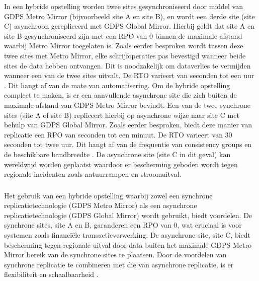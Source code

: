 In een hybride opstelling worden twee sites gesynchroniseerd door middel van GDPS Metro Mirror (bijvoorbeeld site A en site B), en wordt een derde site (site C) asynchroon gerepliceerd met GDPS Global Mirror.
Hierbij geldt dat site A en site B gesynchroniseerd zijn met een RPO van 0 binnen de maximale afstand waarbij Metro Mirror toegelaten is.
Zoals eerder besproken wordt tussen deze twee sites met Metro Mirror, elke schrijfoperaties pas bevestigd wanneer beide sites de data hebben ontvangen.
Dit is noodzakelijk om dataverlies te vermijden wanneer een van de twee sites uitvalt. 
De RTO varieert van seconden tot een uur \autocite{li_2019_planet_mainframe_gdps}.
Dit hangt af van de mate van automatisering.
Om de hybride opstelling compleet te maken, is er een aanvullende asynchrone site die zich buiten de maximale afstand van GDPS Metro Mirror bevindt.
Een van de twee synchrone sites (site A of site B) repliceert hierbij op asynchrone wijze naar site C met behulp van GDPS Global Mirror.
Zoals eerder besproken, biedt deze manier van replicatie een RPO van seconden tot een minuut.
De RTO varieert van 30 seconden tot twee uur.
Dit hangt af van de frequentie van consistency groups en de beschikbare bandbreedte \autocite{gomes_2025_redbooks}.
De asynchrone site (site C in dit geval) kan wereldwijd worden geplaatst waardoor er bescherming geboden wordt tegen regionale incidenten zoals natuurrampen en stroomuitval.

\subsubsection{}
\label{sec:voordelen-hybride-opstelling}

Het gebruik van een hybride opstelling waarbij zowel een synchrone replicatietechnologie (GDPS Metro Mirror) als een asynchrone replicatietechnologie (GDPS Global Mirror) wordt gebruikt, biedt voordelen.
De synchrone sites, site A en B, garanderen een RPO van 0, wat cruciaal is voor systemen zoals financiële transactieverwerking.
De asynchrone site, site C, biedt bescherming tegen regionale uitval door data buiten het maximale GDPS Metro Mirror bereik van de synchrone sites te plaatsen.
Door de voordelen van synchrone replicatie te combineren met die van asynchrone replicatie, is er flexibiliteit en schaalbaarheid \autocite{gomes_2025_redbooks}.

\subsubsection{}
\label{sec:faalscenarios-risicos-hybride-opstelling}

